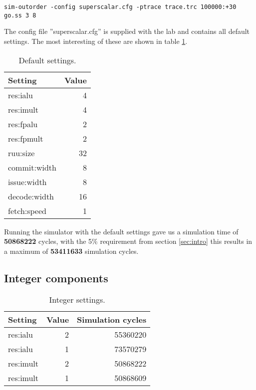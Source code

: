 \documentclass[titlepage, a4paper]{article}
\begin{document}
\begin{lstlisting}[caption=Simulator command., label=sim:simcom, breaklines=true]
sim-outorder -config superscalar.cfg -ptrace trace.trc 100000:+30 go.ss 3 8
\end{lstlisting}

The config file ''superscalar.cfg'' is supplied with the lab and contains all default settings. The most interesting of these are shown in table \ref{tab:default}.

\begin{table}[H]
\centering
\caption{Default settings.}

\begin{tabular}{|l|r|}
  \hline
  \textbf{Setting} & \textbf{Value} \\ \hline
  res:ialu & 4 \\ \hline
  res:imult & 4 \\ \hline
  res:fpalu & 2 \\ \hline
  res:fpmult & 2 \\ \hline
  ruu:size & 32 \\ \hline
  commit:width & 8 \\ \hline
  issue:width & 8 \\ \hline
  decode:width & 16 \\ \hline
  fetch:speed & 1 \\ \hline
\end{tabular}

\label{tab:default}
\end{table}

Running the simulator with the default settings gave us a simulation time of \textbf{50868222} cycles, with the 5\% requirement from section \ref{sec:intro} this results in a maximum of \textbf{53411633} simulation cycles.

\subsection{Integer components}


\begin{table}[H]
\centering
\caption{Integer settings.}

\begin{tabular}{|l|r|r|}
  \hline
  \textbf{Setting} & \textbf{Value} & \textbf{Simulation cycles}\\ \hline
  res:ialu & 2 & 55360220 \\ \hline
  res:ialu & 1 & 73570279 \\ \hline
  res:imult & 2 & 50868222 \\ \hline
  res:imult & 1 & 50868609 \\ \hline
\end{tabular}

\label{tab:integer}
\end{table}
\end{document}
